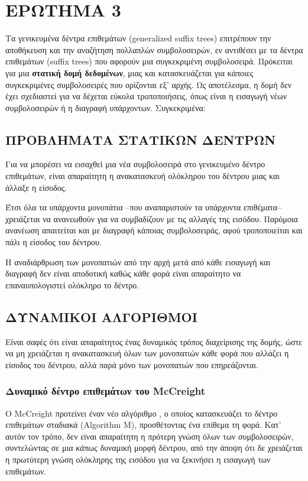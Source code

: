 \chapter{ΕΡΩΤΗΜΑ 3}

    Τα γενικευμένα δέντρα επιθεμάτων (generalized suffix trees) επιτρέπουν την αποθήκευση και την αναζήτηση πολλαπλών συμβολοσειρών, εν αντιθέσει με τα δέντρα επιθεμάτων (suffix trees) που αφορούν μια συγκεκριμένη συμβολοσειρά.
    Πρόκειται για μια \textbf{στατική δομή δεδομένων}, μιας και κατασκευάζεται για κάποιες συγκεκριμένες συμβολοσειρές που ορίζονται εξ' αρχής.
    Ως αποτέλεσμα, η δομή δεν έχει σχεδιαστεί για να δέχεται εύκολα τροποποιήσεις, όπως είναι η εισαγωγή νέων συμβολοσειρών ή η διαγραφή υπάρχοντων. Συγκεκριμένα:

    \section{ΠΡΟΒΛΗΜΑΤΑ ΣΤΑΤΙΚΩΝ ΔΕΝΤΡΩΝ}
        Για να μπορέσει να εισαχθεί μια νέα συμβολοσειρά στο γενικευμένο δέντρο επιθεμάτων, είναι απαραίτητη η ανακατασκευή ολόκληρου του δέντρου μιας και άλλαξε η είσοδος.

        Έτσι όλα τα υπάρχοντα μονοπάτια --που αναπαριστούν τα υπάρχοντα επιθέματα-- χρειάζεται να ανανεωθούν για να συμβαδίζουν με τις αλλαγές της εισόδου.
        Παρόμοια ανανέωση απαιτείται και με διαγραφή κάποιας συμβολοσειράς, αφού τροποποιείται και πάλι η είσοδος του δέντρου.

        Η αναδιάρθρωση των μονοπατιών από την αρχή μετά από κάθε εισαγωγή και διαγραφή δεν είναι αποδοτική καθώς κάθε φορά είναι απαραίτητο να επαναυπολογιστεί ολόκληρο το δέντρο.

    \section{ΔΥΝΑΜΙΚΟΙ ΑΛΓΟΡΙΘΜΟΙ}
        Είναι σαφές ότι είναι απαραίτητος ένας δυναμικός τρόπος διαχείρισης της δομής, ώστε να μη χρειάζεται η ανακατασκευή όλων των μονοπατιών κάθε φορά που αλλάζει η είσοδος του δέντρου, αλλά παρά μόνο των μονοπατιών που επηρεάζονται.

        \subsection{Δυναμικό δέντρο επιθεμάτων του McCreight}
            Ο McCreight προτείνει έναν νέο αλγόριθμο \cite{McCreight_1976}, ο οποίος κατασκευάζει το δέντρο επιθεμάτων σταδιακά (Algorithm M), προσθέτοντας ένα επίθεμα τη φορά.
            Κατ' αυτόν τον τρόπο, δεν είναι απαραίτητη η πρότερη γνώση όλων των συμβολοσειρών, συντελώντας σε μια \textit{κάπως} δυναμική μορφή δέντρου, από την άποψη ότι δε χρειάζεται η πρωτύτερη γνώση ολόκληρης της εισόδου για να ξεκινήσει η εισαγωγή των επιθεμάτων.

